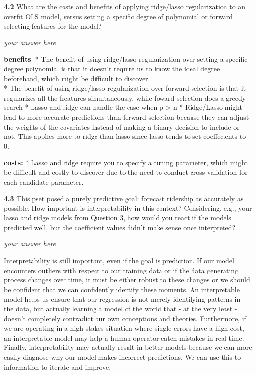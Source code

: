 \documentclass[11pt]{article}
\begin{document}
    \textbf{4.2} What are the costs and benefits of applying ridge/lasso
regularization to an overfit OLS model, versus setting a specific degree
of polynomial or forward selecting features for the model?

    \emph{your answer here}

\textbf{benefits:} * The benefit of using ridge/lasso regularization
over setting a specific degree polynomial is that it doesn't require us
to know the ideal degree beforehand, which might be difficult to
discover.\\
* The benefit of using ridge/lasso regularization over forward selection
is that it regularizes all the freatures simultaneously, while foward
selection does a greedy search * Lasso and ridge can handle the case
when p \textgreater{} n * Ridge/Lasso might lead to more accurate
predictions than forward selection because they can adjust the weights
of the covariates instead of making a binary decision to include or not.
This applies more to ridge than lasso since lasso tends to set
coeffecients to 0.

\textbf{costs:} * Lasso and ridge require you to specify a tuning
parameter, which might be difficult and costly to discover due to the
need to conduct cross validation for each candidate parameter.

    \textbf{4.3} This pset posed a purely predictive goal: forecast
ridership as accurately as possible. How important is interpretability
in this context? Considering, e.g., your lasso and ridge models from
Question 3, how would you react if the models predicted well, but the
coefficient values didn't make sense once interpreted?

    \emph{your answer here}

Interpretability is still important, even if the goal is prediction. If
our model encounters outliers with respect to our training data or if
the data generating process changes over time, it must be either robust
to these changes or we should be confident that we can confidently
identify these moments. An interpretable model helps us ensure that our
regression is not merely identifying patterns in the data, but actually
learning a model of the world that - at the very least - doesn't
completely contradict our own conceptions and theories. Furthermore, if
we are operating in a high stakes situation where single errors have a
high cost, an interpretable model may help a human operator catch
mistakes in real time. Finally, interpretability may actually result in
better models because we can more easily diagnose why our model makes
incorrect predictions. We can use this to information to iterate and
improve.
\end{document}
